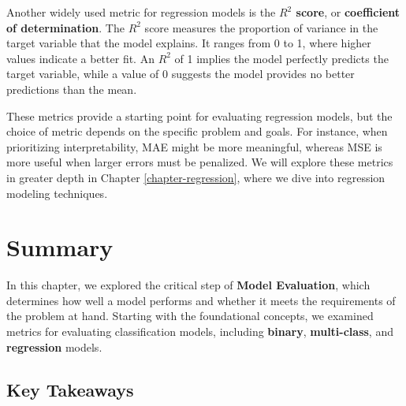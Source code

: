 \documentclass[
]{book}
\theoremstyle{definition}
\theoremstyle{definition}
\theoremstyle{definition}
\theoremstyle{definition}
\theoremstyle{remark}
\begin{document}
Another widely used metric for regression models is the \textbf{\(R^2\) score}, or \textbf{coefficient of determination}. The \(R^2\) score measures the proportion of variance in the target variable that the model explains. It ranges from 0 to 1, where higher values indicate a better fit. An \(R^2\) of 1 implies the model perfectly predicts the target variable, while a value of 0 suggests the model provides no better predictions than the mean.

These metrics provide a starting point for evaluating regression models, but the choice of metric depends on the specific problem and goals. For instance, when prioritizing interpretability, MAE might be more meaningful, whereas MSE is more useful when larger errors must be penalized. We will explore these metrics in greater depth in Chapter \ref{chapter-regression}, where we dive into regression modeling techniques.

\section{Summary}\label{summary-1}

In this chapter, we explored the critical step of \textbf{Model Evaluation}, which determines how well a model performs and whether it meets the requirements of the problem at hand. Starting with the foundational concepts, we examined metrics for evaluating classification models, including \textbf{binary}, \textbf{multi-class}, and \textbf{regression} models.

\subsection*{Key Takeaways}\label{key-takeaways-1}
\end{document}
